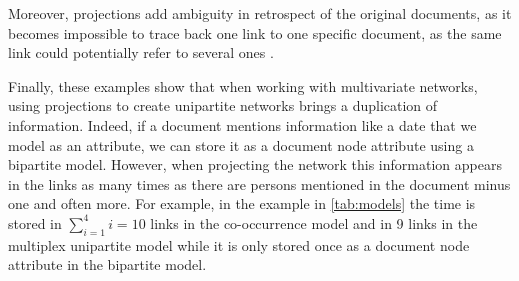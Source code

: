 Moreover, projections add ambiguity in retrospect of the original documents, as it becomes impossible to trace back one link to one specific document, as the same link could potentially refer to several ones \cite{cristofoliAuxSourcesGrands2008}.

Finally, these examples show that when working with multivariate networks, using projections to create unipartite networks brings a duplication of information.
Indeed, if a document mentions information like a date that we model as an attribute, we can store it as a document node attribute using a bipartite model.
However, when projecting the network this information appears in the links as many times as there are persons mentioned in the document minus one and often more.
For example, in the example \pascal in \autoref{tab:models} the time is stored in $\sum_{i=1} ^{4} i = 10$ links in the co-occurrence model and in 9 links in the multiplex unipartite model while it is only stored once as a document node attribute in the bipartite model.

